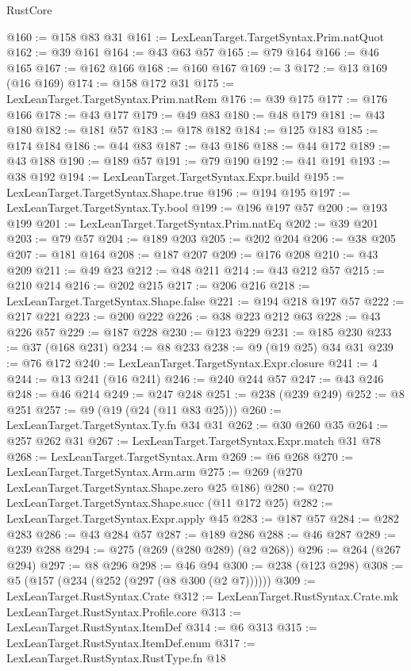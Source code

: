 \begin{lexlean}{RustCore}
\begin{coremodule}
@160 := @158 @83 @31
@161 := LexLeanTarget.TargetSyntax.Prim.natQuot
@162 := @39 @161
@164 := @43 @63 @57
@165 := @79 @164
@166 := @46 @165
@167 := @162 @166
@168 := @160 @167
@169 := 3
@172 := @13 @169 (@16 @169)
@174 := @158 @172 @31
@175 := LexLeanTarget.TargetSyntax.Prim.natRem
@176 := @39 @175
@177 := @176 @166
@178 := @43 @177
@179 := @49 @83
@180 := @48 @179
@181 := @43 @180
@182 := @181 @57
@183 := @178 @182
@184 := @125 @183
@185 := @174 @184
@186 := @44 @83
@187 := @43 @186
@188 := @44 @172
@189 := @43 @188
@190 := @189 @57
@191 := @79 @190
@192 := @41 @191
@193 := @38 @192
@194 := LexLeanTarget.TargetSyntax.Expr.build
@195 := LexLeanTarget.TargetSyntax.Shape.true
@196 := @194 @195
@197 := LexLeanTarget.TargetSyntax.Ty.bool
@199 := @196 @197 @57
@200 := @193 @199
@201 := LexLeanTarget.TargetSyntax.Prim.natEq
@202 := @39 @201
@203 := @79 @57
@204 := @189 @203
@205 := @202 @204
@206 := @38 @205
@207 := @181 @164
@208 := @187 @207
@209 := @176 @208
@210 := @43 @209
@211 := @49 @23
@212 := @48 @211
@214 := @43 @212 @57
@215 := @210 @214
@216 := @202 @215
@217 := @206 @216
@218 := LexLeanTarget.TargetSyntax.Shape.false
@221 := @194 @218 @197 @57
@222 := @217 @221
@223 := @200 @222
@226 := @38 @223 @212 @63
@228 := @43 @226 @57
@229 := @187 @228
@230 := @123 @229
@231 := @185 @230
@233 := @37 (@168 @231)
@234 := @8 @233
@238 := @9 (@19 @25) @34 @31
@239 := @76 @172
@240 := LexLeanTarget.TargetSyntax.Expr.closure
@241 := 4
@244 := @13 @241 (@16 @241)
@246 := @240 @244 @57
@247 := @43 @246
@248 := @46 @214
@249 := @247 @248
@251 := @238 (@239 @249)
@252 := @8 @251
@257 := @9 (@19 (@24 (@11 @83 @25)))
@260 := LexLeanTarget.TargetSyntax.Ty.fn @34 @31
@262 := @30 @260 @35
@264 := @257 @262 @31
@267 := LexLeanTarget.TargetSyntax.Expr.match @31 @78
@268 := LexLeanTarget.TargetSyntax.Arm
@269 := @6 @268
@270 := LexLeanTarget.TargetSyntax.Arm.arm
@275 := @269 (@270 LexLeanTarget.TargetSyntax.Shape.zero @25 @186)
@280 := @270 LexLeanTarget.TargetSyntax.Shape.succ (@11 @172 @25)
@282 := LexLeanTarget.TargetSyntax.Expr.apply @45
@283 := @187 @57
@284 := @282 @283
@286 := @43 @284 @57
@287 := @189 @286
@288 := @46 @287
@289 := @239 @288
@294 := @275 (@269 (@280 @289) (@2 @268))
@296 := @264 (@267 @294)
@297 := @8 @296
@298 := @46 @94
@300 := @238 (@123 @298)
@308 := @5 (@157 (@234 (@252 (@297 (@8 @300 (@2 @7))))))
@309 := LexLeanTarget.RustSyntax.Crate
@312 := LexLeanTarget.RustSyntax.Crate.mk LexLeanTarget.RustSyntax.Profile.core
@313 := LexLeanTarget.RustSyntax.ItemDef
@314 := @6 @313
@315 := LexLeanTarget.RustSyntax.ItemDef.enum
@317 := LexLeanTarget.RustSyntax.RustType.fn @18

\end{coremodule}
\end{lexlean}
